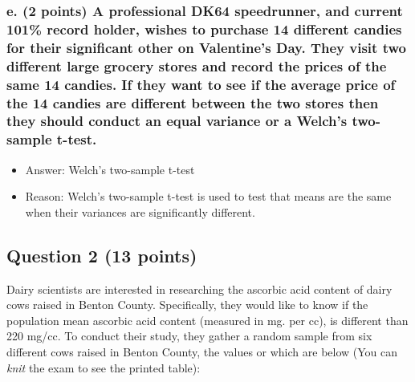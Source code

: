 \documentclass[
]{article}
\providecommand{\tightlist}{%
  \setlength{\itemsep}{0pt}\setlength{\parskip}{0pt}}
\begin{document}
\hypertarget{e.-2-points-a-professional-dk64-speedrunner-and-current-101-record-holder-wishes-to-purchase-14-different-candies-for-their-significant-other-on-valentines-day.-they-visit-two-different-large-grocery-stores-and-record-the-prices-of-the-same-14-candies.-if-they-want-to-see-if-the-average-price-of-the-14-candies-are-different-between-the-two-stores-then-they-should-conduct-an-equal-variance-or-a-welchs-two-sample-t-test.}{%
\subsubsection{e. (2 points) A professional DK64 speedrunner, and
current 101\% record holder, wishes to purchase 14 different candies for
their significant other on Valentine's Day. They visit two different
large grocery stores and record the prices of the same 14 candies. If
they want to see if the average price of the 14 candies are different
between the two stores then they should conduct an equal variance or a
Welch's two-sample
t-test.}\label{e.-2-points-a-professional-dk64-speedrunner-and-current-101-record-holder-wishes-to-purchase-14-different-candies-for-their-significant-other-on-valentines-day.-they-visit-two-different-large-grocery-stores-and-record-the-prices-of-the-same-14-candies.-if-they-want-to-see-if-the-average-price-of-the-14-candies-are-different-between-the-two-stores-then-they-should-conduct-an-equal-variance-or-a-welchs-two-sample-t-test.}}

\begin{itemize}
\tightlist
\item
  Answer: Welch's two-sample t-test
\item
  Reason: Welch's two-sample t-test is used to test that means are the
  same when their variances are significantly different.
\end{itemize}

\newpage

\hypertarget{question-2-13-points}{%
\subsection{Question 2 (13 points)}\label{question-2-13-points}}

Dairy scientists are interested in researching the ascorbic acid content
of dairy cows raised in Benton County. Specifically, they would like to
know if the population mean ascorbic acid content (measured in mg. per
cc), is different than 220 mg/cc. To conduct their study, they gather a
random sample from six different cows raised in Benton County, the
values or which are below (You can \emph{knit} the exam to see the
printed table):
\end{document}
